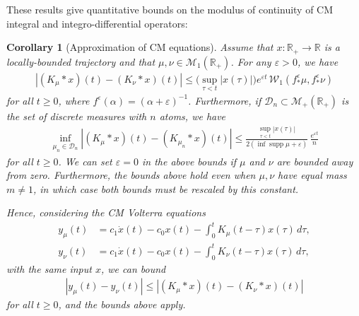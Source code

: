 \documentclass{cams-l} %
\newcommand{\RR}{\mathbb R}
\newcommand{\cM}{\mathcal M}
\newcommand{\cD}{\mathcal D}
\newcommand{\eps}{\varepsilon}
\newcommand{\supp}{\operatorname{supp}}
\newtheorem{corollary}[theorem]{Corollary}
\theoremstyle{definition}
\theoremstyle{remark}
\numberwithin{equation}{section}
\begin{document}
These results give quantitative bounds on the modulus of continuity of CM integral and integro-differential operators:
\begin{corollary}[Approximation of CM equations]\label{cor:conv_diff}
    Assume that $x: \RR_+ \to \RR$ is a locally-bounded trajectory and that $\mu, \nu \in \cM_1(\RR_+)$. For any $\eps>0$, we have
    \begin{align*}
        |(K_\mu * x)(t) - (K_\nu * x)(t)| \leq \big(\sup_{\tau<t}|x(\tau)|\big)e^{\varepsilon t}\, \mathcal{W}_1(f^\varepsilon_*\mu, f^\varepsilon_*\nu)
    \end{align*}
    for all $t\geq 0$, where $f^\varepsilon(\alpha) = (\alpha + \varepsilon)^{-1}$. Furthermore, if $\cD_n\subset\cM_+(\RR_+)$ is the set of discrete measures with $n$ atoms, we have
    \begin{align*}
        \inf_{\mu_n \in \mathcal{D}_n}|(K_\mu * x)(t) - (K_{\mu_n} * x)(t)| \leq \frac{\sup_{\tau<t}|x(\tau)|}{2(\inf\supp \mu + \varepsilon)}\,\frac{e^{\varepsilon t} }{n}
    \end{align*}
    for all $t \geq 0$. We can set $\varepsilon = 0$ in the above bounds if $\mu$ and $\nu$ are bounded away from zero. Furthermore, the bounds above hold even when $\mu, \nu$ have equal mass $m \neq 1$, in which case both bounds must be rescaled by this constant.

    Hence, considering the CM Volterra equations
    \begin{align*}
        y_\mu(t) &= c_1\dot{x}(t) - c_0x(t) - \int_0^t K_\mu(t-\tau)x(\tau)\,d\tau,\\
        y_\nu(t) &= c_1\dot{x}(t) - c_0x(t) - \int_0^t K_\nu(t-\tau)x(\tau)\,d\tau,
    \end{align*}
    with the same input $x$, we can bound
    \begin{align*}
        |y_\mu(t) - y_\nu(t)| \leq |(K_\mu * x)(t) - (K_\nu * x)(t)|
    \end{align*}
    for all $t \geq 0$, and the bounds above apply.
\end{corollary}
\end{document}

